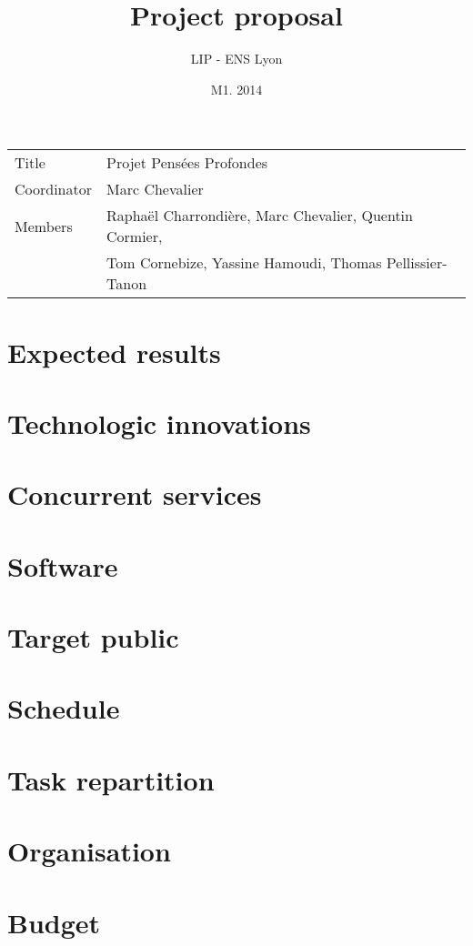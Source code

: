 \documentclass[a4paper,10pt]{article}
\title{Project proposal}
\author{LIP - ENS Lyon}
\date{M1. 2014}
\begin{document}
\maketitle

\begin{tabular}{|ll|}
\hline
Title & Projet Pensées Profondes\\
Coordinator & Marc Chevalier\\
Members & Raphaël Charrondière, Marc Chevalier, Quentin Cormier, \\
        & Tom Cornebize, Yassine Hamoudi, Thomas Pellissier-Tanon\\
\hline
\end{tabular}

\section{Expected results}

\section{Technologic innovations}

\section{Concurrent services}

\section{Software}

\section{Target public}

\section{Schedule}

\section{Task repartition}

\section{Organisation}

\section{Budget}
\end{document}
